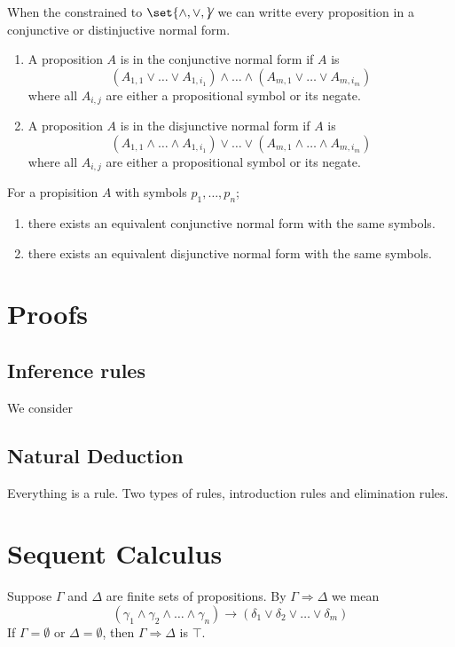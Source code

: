 When the constrained to \(\set{\land,\lor,\not}\) we can writte every proposition in a conjunctive or distinjuctive normal form. 
\begin{enumerate}
    \item A proposition \(A\) is in the conjunctive normal form if \(A\) is 
    \begin{equation*}
        (A_{1,1} \lor \dots \lor A_{1,i_1}) \land \dots \land (A_{m,1} \lor \dots \lor A_{m,i_m})
    \end{equation*}
    where all \(A_{i,j}\) are either a propositional symbol or its negate.
    \item A proposition \(A\) is in the disjunctive normal form if \(A\) is 
    \begin{equation*}
        (A_{1,1} \land \dots \land A_{1,i_1}) \lor \dots \lor (A_{m,1} \land \dots \land A_{m,i_m})
    \end{equation*}
    where all \(A_{i,j}\) are either a propositional symbol or its negate.
\end{enumerate}

\begin{theorem}
    For a propisition \(A\) with symbols \(p_1,\dots,p_n\);
    \begin{enumerate}
        \item there exists an equivalent conjunctive normal form with the same symbols.
         \item there exists an equivalent disjunctive normal form with the same symbols.
    \end{enumerate}
\end{theorem}

\section{Proofs}
 \subsection{Inference rules}
We consider 
 \subsection{Natural Deduction}
 Everything is a rule. Two types of rules, introduction rules and elimination rules.


\section{Sequent Calculus}
Suppose \(\Gamma\) and \(\Delta\) are finite sets of propositions. By \(\Gamma \Rightarrow \Delta\) we mean 
\begin{equation}
   ( \gamma_1 \land \gamma_2 \land \dots \land \gamma_n) \to (\delta_1 \lor \delta_2 \lor \dots \lor \delta_m)
\end{equation}
If \(\Gamma = \emptyset\) or \(\Delta = \emptyset\), then \(\Gamma \Rightarrow \Delta\) is \(\top\).

